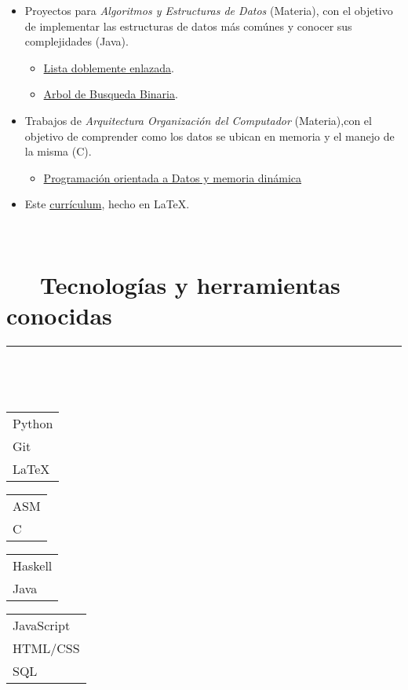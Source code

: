 \documentclass{article}
\begin{document}
\begin{itemize}
    \item Proyectos para \textit{Algoritmos y Estructuras de Datos} (Materia), con el objetivo de  implementar las estructuras de datos más comúnes y conocer sus complejidades (Java).
    \begin{itemize}
        \item\href{https://github.com/Agelar01/Algoritmos-y-estructuras-de-datos-/tree/main/Lista%20enlazada/main}{Lista doblemente enlazada}.
        \item \href{https://github.com/Agelar01/Algoritmos-y-estructuras-de-datos-/tree/main/ABB/main}{Arbol de Busqueda Binaria}.
       
    \end{itemize}
    \item Trabajos de \textit{Arquitectura Organización del Computador} (Materia),con el objetivo de comprender como los datos se ubican en memoria y el manejo de la misma (C).
    \begin{itemize}
        \item \href{https://github.com/Agelar01/Arquitectura-y-organizaci-n-del-Computador/tree/main/Programaci%C3%B3n%20orientada%20a%20datos%20y%20memoria%20din%C3%A1mica}{Programación orientada a Datos y memoria dinámica} 
    \end{itemize}
    \item Este \href{https://github.com/Agelar01/Resume}{currículum}, hecho en \LaTeX.
\end{itemize}


\
\newline
\


\section*{\faCogs ~~ Tecnologías y herramientas conocidas} 
\hrule
\

\
    
\begin{multicols}{4}
    \begin{tabular}{l}
        Python \\
        Git \\
        LaTeX
    \end{tabular}

    \begin{tabular}{l}
        ASM \\
        C
    \end{tabular}
    
    \begin{tabular}{l}
        Haskell \\
        Java
    \end{tabular}
    
    \begin{tabular}{l}
        JavaScript \\
        HTML/CSS  \\
        SQL
    \end{tabular}
   
\end{multicols}
\end{document}
